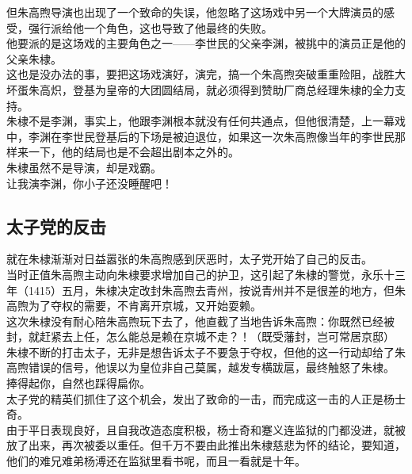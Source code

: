 \begin{multicols}{\theparacolNo}
但朱高煦导演也出现了一个致命的失误，他忽略了这场戏中另一个大牌演员的感受，强行派给他一个角色，这也导致了他最终的失败。\\

他要派的是这场戏的主要角色之一——李世民的父亲李渊，被挑中的演员正是他的父亲朱棣。\\

这也是没办法的事，要把这场戏演好，演完，搞一个朱高煦突破重重险阻，战胜大坏蛋朱高炽，登基为皇帝的大团圆结局，就必须得到赞助厂商总经理朱棣的全力支持。\\

朱棣不是李渊，事实上，他跟李渊根本就没有任何共通点，但他很清楚，上一幕戏中，李渊在李世民登基后的下场是被迫退位，如果这一次朱高煦像当年的李世民那样来一下，他的结局也是不会超出剧本之外的。\\

朱棣虽然不是导演，却是戏霸。\\

让我演李渊，你小子还没睡醒吧！\\

\subsection{太子党的反击}
就在朱棣渐渐对日益嚣张的朱高煦感到厌恶时，太子党开始了自己的反击。\\

当时正值朱高煦主动向朱棣要求增加自己的护卫，这引起了朱棣的警觉，永乐十三年（1415）五月，朱棣决定改封朱高煦去青州，按说青州并不是很差的地方，但朱高煦为了夺权的需要，不肯离开京城，又开始耍赖。\\

这次朱棣没有耐心陪朱高煦玩下去了，他直截了当地告诉朱高煦：你既然已经被封，就赶紧去上任，怎么能总是赖在京城不走？！（既受藩封，岂可常居京邸）\\

朱棣不断的打击太子，无非是想告诉太子不要急于夺权，但他的这一行动却给了朱高煦错误的信号，他误以为皇位非自己莫属，越发专横跋扈，最终触怒了朱棣。\\

捧得起你，自然也踩得扁你。\\

太子党的精英们抓住了这个机会，发出了致命的一击，而完成这一击的人正是杨士奇。\\

由于平日表现良好，且自我改造态度积极，杨士奇和蹇义连监狱的门都没进，就被放了出来，再次被委以重任。但千万不要由此推出朱棣慈悲为怀的结论，要知道，他们的难兄难弟杨溥还在监狱里看书呢，而且一看就是十年。\\


\end{multicols}
